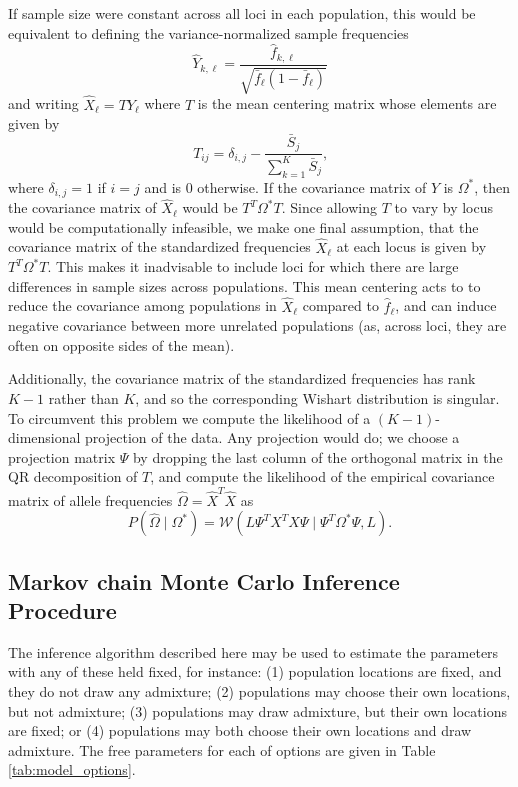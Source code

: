 \documentclass[12pt]{article}
\newcommand{\given}{\mid}
\begin{document}
If sample size were constant across all loci in each population, this would be equivalent to defining the variance-normalized sample frequencies
\begin{equation}
\hat{Y}_{k,\ell} = \frac{ \hat{f}_{k,\ell} } {\sqrt{\bar{f}_{\ell}(1-\bar{f}_{\ell})}}
\end{equation}
and writing $\hat{X}_{\ell} = T Y_{\ell} $ where $T$ is the mean centering matrix whose elements are given by
\begin{equation}
T_{ij} = \delta_{i,j}  -  \frac{\bar{S}_j}{\sum\limits_{k=1}^{K} \bar{S}_j	} \text{,}
\end{equation}
where $\delta_{i,j}=1$ if $i=j$ and is 0 otherwise.
If the covariance matrix of $Y$ is $\Omega^*$,
then the covariance matrix of $\hat X_\ell$ would be $T^T \Omega^* T$.
Since allowing $T$ to vary by locus would be computationally infeasible,
we make one final assumption,
that the covariance matrix of the standardized frequencies $\hat X_\ell$ at each locus is given by $T^T \Omega^* T$.
This makes it inadvisable to include loci for which there are large differences in sample sizes across populations.
This mean centering acts to to reduce the covariance among populations in $\hat{X}_{\ell}$ compared to $\hat{f}_{\ell}$, and can induce negative covariance between more unrelated populations (as, across loci, they are often on opposite sides of the mean). 

Additionally, the covariance matrix of the standardized frequencies has rank $K-1$ rather than $K$,
and so the corresponding Wishart distribution is singular.
To circumvent this problem we compute the likelihood of a $(K-1)$-dimensional projection of the data.
Any projection would do; we choose a projection matrix $\Psi$ by dropping the last column of the orthogonal matrix in the QR decomposition of $T$,
and compute the likelihood of the empirical covariance matrix of allele frequencies $\widehat\Omega = \hat X^T \hat X$ as
\begin{equation} \label{eq:projected_wishart_dist}
  P(\widehat{\Omega} \given \Omega^*) = \mathcal{W}\left( L \Psi^T X^T X \Psi \given  \Psi^{T} \Omega^* \Psi, L \right) \text{.}
\end{equation}


\subsection*{Markov chain Monte Carlo Inference Procedure}

The inference algorithm described here may be used to estimate the parameters with any of these held fixed,
for  instance:
(1) population locations are fixed, and they do not draw any admixture; 
(2) populations may choose their own locations, but not admixture; 
(3) populations may draw admixture, but their own locations are fixed; or
(4) populations may both choose their own locations and draw admixture.  
The free parameters for each of options are given in Table \ref{tab:model_options}.
\end{document}
